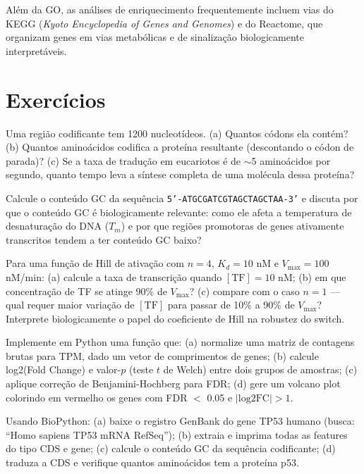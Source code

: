 Além da GO, as análises de enriquecimento frequentemente incluem vias do KEGG
(\textit{Kyoto Encyclopedia of Genes and Genomes}) e do Reactome, que organizam genes em
vias metabólicas e de sinalização biologicamente interpretáveis.


\section{Exercícios}

\begin{exercicio}
Uma região codificante tem 1200 nucleotídeos. (a) Quantos códons ela contém? (b) Quantos
aminoácidos codifica a proteína resultante (descontando o códon de parada)? (c) Se a taxa
de tradução em eucariotos é de $\sim$5 aminoácidos por segundo, quanto tempo leva a
síntese completa de uma molécula dessa proteína?
\end{exercicio}

\begin{exercicio}
Calcule o conteúdo GC da sequência \texttt{5'-ATGCGATCGTAGCTAGCTAA-3'} e discuta por que
o conteúdo GC é biologicamente relevante: como ele afeta a temperatura de desnaturação
do DNA ($T_m$) e por que regiões promotoras de genes ativamente transcritos tendem a ter
conteúdo GC baixo?
\end{exercicio}

\begin{exercicio}
Para uma função de Hill de ativação com $n = 4$, $K_d = 10$ nM e $V_{\max} = 100$
nM/min: (a) calcule a taxa de transcrição quando $[\text{TF}] = 10$ nM; (b) em que
concentração de TF se atinge 90\% de $V_{\max}$? (c) compare com o caso $n = 1$ ---
qual requer maior variação de $[\text{TF}]$ para passar de 10\% a 90\% de $V_{\max}$?
Interprete biologicamente o papel do coeficiente de Hill na robustez do switch.
\end{exercicio}

\begin{exercicio}
Implemente em Python uma função que: (a) normalize uma matriz de contagens brutas para
TPM, dado um vetor de comprimentos de genes; (b) calcule log2(Fold Change) e valor-$p$
(teste $t$ de Welch) entre dois grupos de amostras; (c) aplique correção de Benjamini-Hochberg
para FDR; (d) gere um volcano plot colorindo em vermelho os genes com FDR $<$ 0.05 e
$|\text{log2FC}| > 1$.
\end{exercicio}

\begin{exercicio}[BioPython]
Usando BioPython: (a) baixe o registro GenBank do gene TP53 humano (busca: ``Homo sapiens
TP53 mRNA RefSeq''); (b) extraia e imprima todas as features do tipo CDS e gene;
(c) calcule o conteúdo GC da sequência codificante; (d) traduza a CDS e verifique quantos
aminoácidos tem a proteína p53.
\end{exercicio}

